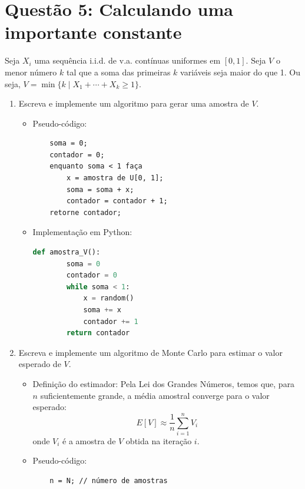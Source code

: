 \documentclass[12 pt]{article}
\begin{document}
\section*{Questão 5: Calculando uma importante constante}

Seja $X_i$ uma sequência i.i.d. de v.a. contínuas uniformes em $[0, 1]$. Seja $V$ o menor número $k$ tal que a soma das primeiras $k$ variáveis seja maior do que 1. Ou seja, $V = \min\{k \mid X_1 + \cdots + X_k \geq 1\}$.

\begin{enumerate}
    \item Escreva e implemente um algoritmo para gerar uma amostra de $V$.
    \begin{tcolorbox}[colframe=black, title=Resposta:]
        \begin{itemize}
            \item Pseudo-código:
            \begin{verbatim}
    soma = 0;
    contador = 0;
    enquanto soma < 1 faça
        x = amostra de U[0, 1];
        soma = soma + x;
        contador = contador + 1;
    retorne contador;
            \end{verbatim}
            \item Implementação em Python:
            \begin{lstlisting}[language=Python]
    def amostra_V():
        soma = 0
        contador = 0
        while soma < 1:
            x = random()
            soma += x
            contador += 1
        return contador
            \end{lstlisting}
        \end{itemize}
    \end{tcolorbox}
    \newpage
    \item Escreva e implemente um algoritmo de Monte Carlo para estimar o valor esperado de $V$.
    \begin{tcolorbox}[colframe=black, title=Resposta:]
        \begin{itemize}
            \item Definição do estimador:
            Pela Lei dos Grandes Números, temos que, para $n$ suficientemente grande, a média amostral converge para o valor esperado:
            $$
            E[V] \approx \frac{1}{n} \sum_{i=1}^n V_i
            $$
            onde $V_i$ é a amostra de $V$ obtida na iteração $i$.
            \item Pseudo-código:
            \begin{verbatim}
    n = N; // número de amostras

\end{verbatim}
\end{itemize}
\end{tcolorbox}
\end{enumerate}
\end{document}
